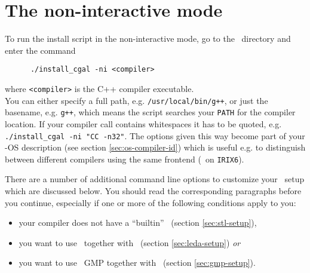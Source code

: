 
\section{The non-interactive mode \label{sec:non-interactive}}

To run the install script in the non-interactive mode, go to the
\cgaldir\ directory and enter the command
\begin{verbatim}
      ./install_cgal -ni <compiler>
\end{verbatim}
where \texttt{<compiler>} is the C++ compiler executable.\\
You can either specify a full path, e.g. \texttt{/usr/local/bin/g++},
or just the basename, e.g. \texttt{g++}, which means the script
searches your \texttt{PATH} for the compiler location. If your
compiler call contains whitespaces it has to be quoted, e.g.
\texttt{./install\_cgal -ni "CC -n32"}.  The options given this way
become part of your \cgal-OS description (see section
\ref{sec:os-compiler-id}) which is useful e.g. to distinguish between
different compilers using the same frontend (\mipsprocc\ on
\texttt{IRIX6}).

There are a number of additional command line options to customize
your \cgal\ setup which are discussed below. You should read the
corresponding paragraphs before you continue, especially if one or
more of the following conditions apply to you:
\begin{itemize}
\item your compiler does not have a ``builtin'' \stl\ (section
  \ref{sec:stl-setup}),
\item you want to use \leda\ together with \cgal\ (section
  \ref{sec:leda-setup}) \textit{or}
\item you want to use \gnu\ GMP together with \cgal\ (section
  \ref{sec:gmp-setup}).
\end{itemize}

